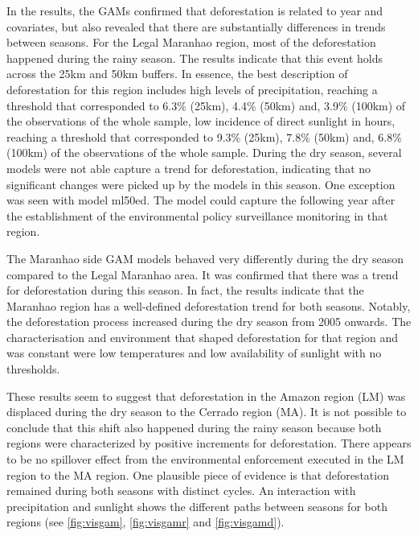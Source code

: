 
In the results, the GAMs confirmed that deforestation is related to year and covariates, but also revealed that there are substantially differences in trends between seasons. For the Legal Maranhao region, most of the deforestation happened during the rainy season. The results indicate that this event holds across the 25km and 50km buffers. In essence, the best description of deforestation for this region includes high levels of precipitation, reaching a threshold that corresponded to 6.3\% (25km), 4.4\% (50km) and, 3.9\% (100km) of the observations of the whole sample, low incidence of direct sunlight in hours, reaching a threshold that corresponded to 9.3\% (25km), 7.8\% (50km) and, 6.8\% (100km) of the observations of the whole sample. During the dry season, several models were not able capture a trend for deforestation, indicating that no significant changes were picked up by the models in this season. One exception was seen with model ml50ed. The model could capture the following year after the establishment of the environmental policy surveillance monitoring in that region.

The Maranhao side GAM models behaved very differently during the dry season compared to the Legal Maranhao area. It was confirmed that there was a trend for deforestation during this season. In fact, the results indicate that the Maranhao region has a well-defined deforestation trend for both seasons. Notably, the deforestation process increased during the dry season from 2005 onwards. The characterisation and environment that shaped deforestation for that region and was constant were low temperatures and low availability of sunlight with no thresholds. 



These results seem to suggest that deforestation in the Amazon region (LM) was displaced during the dry season to the Cerrado region (MA). It is not possible to conclude that this shift also happened during the rainy season because both regions were characterized by positive increments for deforestation. There appears to be no spillover effect from the environmental enforcement executed in the LM region to the MA region. One plausible piece of evidence is that deforestation remained during both seasons with distinct cycles. An interaction with precipitation and sunlight shows the different paths between seasons for both regions (see \ref{fig:visgam}, \ref{fig:visgamr} and \ref{fig:visgamd}). 

